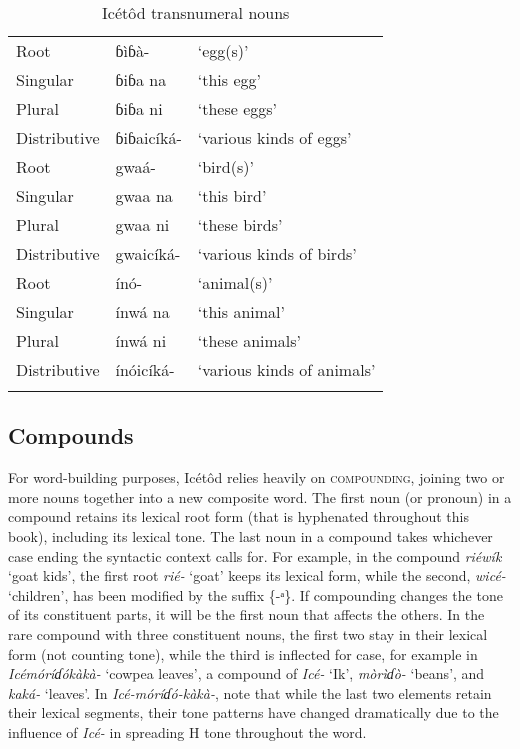 \begin{table}
\caption{Icétôd transnumeral nouns}
\label{tab:nouns:trans}
\begin{tabularx}{\textwidth}{XXl}
\lsptoprule
Root & ɓìɓà- & ‘egg(s)’\\
Singular & ɓiɓa na & ‘this egg’\\
Plural & ɓiɓa ni & ‘these eggs’\\
Distributive & ɓiɓaicíká- & ‘various kinds of eggs’\\
\tablevspace
Root & gwaá- & ‘bird(s)’\\
Singular & gwaa na & ‘this bird’\\
Plural & gwaa ni & ‘these birds’\\
Distributive & gwaicíká- & ‘various kinds of birds’\\
\tablevspace
Root & ínó- & ‘animal(s)’\\
Singular & ínwá na & ‘this animal’\\
Plural & ínwá ni & ‘these animals’\\
Distributive & ínóicíká- & ‘various kinds of animals’\\
\lspbottomrule
\end{tabularx}
\end{table}



\subsection{Compounds}\label{sec:4.3}


For word-building purposes, Icétôd relies heavily on \textsc{compounding}, joining two or more nouns together into a new composite word. The first noun (or pronoun) in a compound retains its lexical root form (that is hyphenated throughout this book), including its lexical tone. The last noun in a compound takes whichever case ending the syntactic context calls for. For example, in the compound \textit{riéwík\ᵃ} ‘goat kids’, the first root \textit{rié-} ‘goat’ keeps its lexical form, while the second, \textit{wicé-} ‘children’, has been modified by the  suffix \{-ᵃ\}. If compounding changes the tone of its constituent parts, it will be the first noun that affects the others. In the rare compound with three constituent nouns, the first two stay in their lexical form (not counting tone), while the third is inflected for case, for example in \textit{Icémóríɗókàkà-} ‘cowpea leaves’, a compound of \textit{Icé-} ‘Ik’, \textit{mòrìɗò-} ‘beans’, and \textit{kaká-} ‘leaves’. In \textit{Icé-móríɗó-kàkà-}, note that while the last two elements retain their lexical segments, their tone patterns have changed dramatically due to the influence of \textit{Icé-} in spreading H tone throughout the word.

